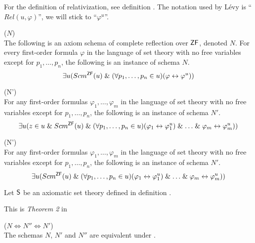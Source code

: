 For the definition of relativization, see definition . The notation used by Lévy is ``$Rel(u, \varphi)$'', we will stick to ``$\varphi^{u}$''.
\begin{definition}{($N$)}\label{def:levy_axiom_n}\\
The following is an axiom schema of complete reflection over $\sf{ZF}$, denoted $N$. For every first-order formula $\varphi$ in the language of set theory with no free variables except for $p_1, \ldots , p_n$, the following is an instance of schema $N$.
\begin{equation}
\exists u (Scm^{\sf{ZF}}(u) \mathrel{\&} (\forall p_1, \ldots, p_n \in u)(\varphi \leftrightarrow \varphi^{u}))
\end{equation}
\end{definition}

\begin{definition}{(N')}\label{def:levy_axiom_n'}\\
For any first-order formulas $\varphi_1, \ldots, \varphi_m$ in the language of set theory with no free variables except for $p_1, \ldots , p_n$, the following is an instance of schema $N'$.
\begin{equation}
\exists u (z \in u \mathrel{\&} Scm^{\sf{ZF}}(u) \mathrel{\&} (\forall p_1, \ldots, p_n \in u)(\varphi_1 \leftrightarrow \varphi_1^{u}) \mathrel{\&} \ldots \mathrel{\&} \varphi_m \leftrightarrow \varphi_m^{u}))
\end{equation}
\end{definition}

\begin{definition}{(N')}\label{def:levy_axiom_n'}\\
For any first-order formulas $\varphi_1, \ldots, \varphi_m$ in the language of set theory with no free variables except for $p_1, \ldots , p_n$, the following is an instance of schema $N'$.
\begin{equation}
\exists u (Scm^{\sf{ZF}}(u) \mathrel{\&} (\forall p_1, \ldots, p_n \in u)(\varphi_1 \leftrightarrow \varphi_1^{u}) \mathrel{\&} \ldots \mathrel{\&} \varphi_m \leftrightarrow \varphi_m^{u}))
\end{equation}
\end{definition}

Let $\sf{S}$ be an axiomatic set theory defined in definition .

This is \emph{Theorem 2} in \cite{Levy60a}
\begin{lemma}{($N \iff N'' \iff N'$)}\label{lemma:n_iff_n'}\\
The schemas $N$, $N'$ and $N''$ are equivalent under .
\end{lemma}

